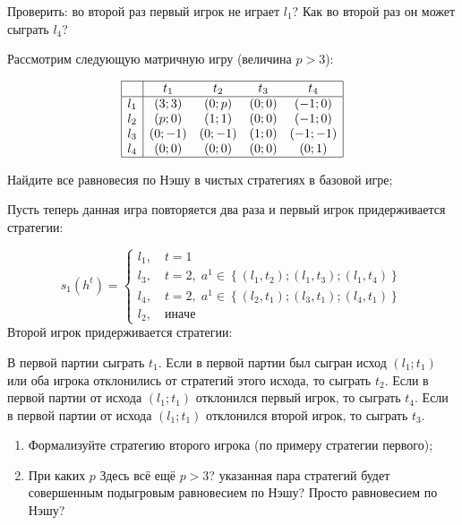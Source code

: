 \begin{problem}
{\red Проверить: во второй раз первый игрок не играет $l_1$? Как во второй раз он может сыграть $l_4$?}


Рассмотрим следующую матричную игру (величина $p>3$):

\[\begin{array}{|c|cccc|}  \hline {} & {t_{1} } & {t_{2} } & {t_{3} } & {t_{4} } \\  \hline {l_{1} } & {\left(3;3\right)} & {\left(0;p\right)} & {\left(0;0\right)} & {\left(-1;0\right)} \\ {l_{2} } & {\left(p;0\right)} & {\left(1;1\right)} & {\left(0;0\right)} & {\left(-1;0\right)} \\ {l_{3} } & {\left(0;-1\right)} & {\left(0;-1\right)} & {\left(1;0\right)} & {\left(-1;-1\right)} \\ {l_{4} } & {\left(0;0\right)} & {\left(0;0\right)} & {\left(0;0\right)} & {\left(0;1\right)} \\  \hline  \end{array}\]

\item Найдите все равновесия по Нэшу в чистых стратегиях в базовой игре;\par

Пусть теперь данная игра повторяется два раза и первый игрок придерживается стратегии:

\[s_{1} \left(h^{t} \right)=\left\{\begin{array}{l} {l_{1},\quad t=1} \\ {l_{3},\quad t=2,\; a^{1} \in \left\{\left(l_{1},t_{2} \right);\left(l_{1},t_{3} \right);\left(l_{1},t_{4} \right)\right\}} \\ {l_{4},\quad t=2,\; a^{1} \in \left\{\left(l_{2},t_{1} \right);\left(l_{3},t_{1} \right);\left(l_{4},t_{1} \right)\right\}} \\ {l_{2},\quad иначе} \end{array}\right. \]
Второй игрок придерживается стратегии:

В первой партии сыграть  $t_{1}$.
Если в первой партии был сыгран исход  $\left(l_{1} ;t_{1} \right)$  или оба игрока отклонились от стратегий этого исхода, то сыграть  $t_{2}$.
Если в первой партии от исхода  $\left(l_{1} ;t_{1} \right)$  отклонился первый игрок, то сыграть  $t_{4} $.
Если в первой партии от исхода  $\left(l_{1} ;t_{1} \right)$  отклонился второй игрок, то сыграть  $t_{3} $.
\begin{enumerate}
\item Формализуйте стратегию второго игрока (по примеру стратегии первого);\par
\item  При каких  $p$ {\red Здесь всё ещё $p>3$?} указанная пара стратегий будет совершенным подыгровым равновесием по Нэшу? Просто равновесием по Нэшу?
\end{enumerate}


\begin{sol}

\end{sol}
\end{problem}




